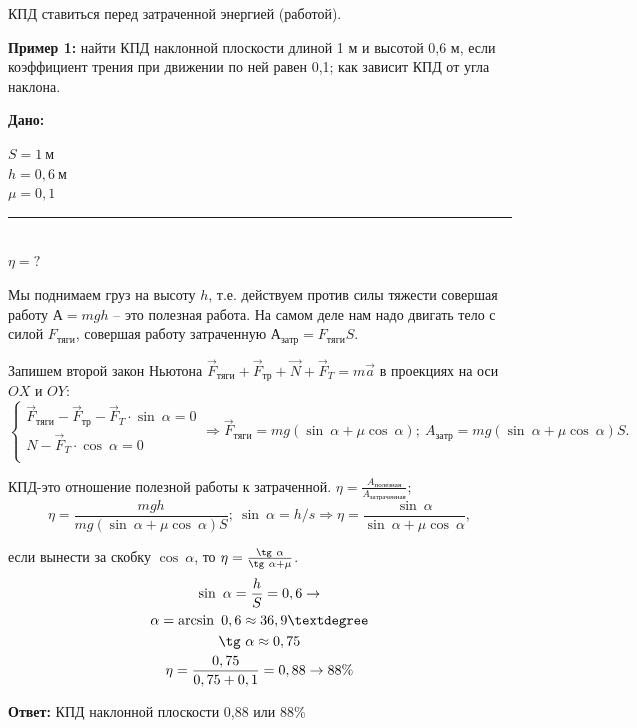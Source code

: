 \documentclass[a5paper, 10pt]{diss_4}
\renewcommand{\'}{\,'}
\begin{document}
КПД ставиться перед затраченной энергией (работой).

\textbf{Пример 1:} найти КПД наклонной плоскости длиной 1 м и высотой 0,6 м, если коэффициент трения при движении по ней равен 0,1; как зависит КПД от угла наклона.

\hspace{1cm}\textbf{Дано:}\hspace{.3cm}
\parbox[t]{4cm}{
$S= 1\ м$\\
$h= 0,6\ м$\\
$\mu=0,1$\\
\rule{4cm}{.4pt}\\
$\eta = ?$\\
}


Мы поднимаем груз на высоту $h$, т.е. действуем против силы тяжести совершая работу $А=mgh$ -- это полезная работа. На  самом деле нам надо двигать тело с силой $F_{тяги}$, совершая работу затраченную $А_{затр}= F_{тяги}S$.

Запишем второй закон Ньютона $\vec{F}_{тяги}+\vec{F}_{тр}+\vec{N}+\vec{F}_{T}=m\vec{a}$ в проекциях на оси $OX$ и $OY$:
\begin{equation*}
     \left\{
          \begin{array}{lr}
 \vec{F}_{тяги}-\vec{F}_{тр}-\vec{F}_{T}\cdot\sin\ \alpha=0\\
 N-\vec{F}_{T}\cdot\cos\ \alpha=0\\
          \end{array}\Rightarrow
\vec{F}_{тяги}=mg(\sin\ \alpha+\mu\cos\ \alpha);\ A_{затр}=mg(\sin\ \alpha+\mu\cos\ \alpha)S.
     \right.
\end{equation*}

КПД-это отношение полезной работы к затраченной. $\eta=\frac{A_{полезная}}{A_{затраченная}}$;
\[
\eta=\frac{mgh}{mg(\sin\ \alpha+\mu\cos\ \alpha)S};\ \sin\ \alpha=h/s\Rightarrow
\eta=\frac{\sin\ \alpha}{\sin\ \alpha+\mu\cos\ \alpha},
\]

если вынести за скобку $\cos\ \alpha$, то $\eta=\frac{\tg\ \alpha}{\tg\ \alpha+\mu}$.
\begin{gather*}
\sin\ \alpha=\frac{h}{S}=0,6\to\\
\alpha=\arcsin\ 0,6\approx36,9\textdegree\\
\tg\ \alpha\approx0,75\\
\eta=\frac{0,75}{0,75+0,1}=0,88\to88\%
\end{gather*}

\textbf{Ответ:} КПД наклонной плоскости 0,88 или 88\%
\end{document}
